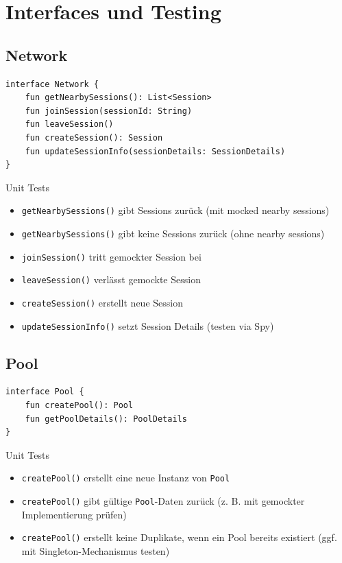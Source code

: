 \documentclass[11pt,a4paper,headsepline,footsepline,bibliography=totocnumbered]{article}
\begin{document}
\section{Interfaces und Testing}
\subsection{Network}
\begin{verbatim}
interface Network {
    fun getNearbySessions(): List<Session>
    fun joinSession(sessionId: String)
    fun leaveSession()
    fun createSession(): Session
    fun updateSessionInfo(sessionDetails: SessionDetails)
}
\end{verbatim}
Unit Tests
 \begin{itemize}
	\item \texttt{getNearbySessions()} gibt Sessions zurück (mit mocked nearby sessions)
	\item \texttt{getNearbySessions()} gibt keine Sessions zurück (ohne nearby sessions)
	\item \texttt{joinSession()} tritt gemockter Session bei
	\item \texttt{leaveSession()} verlässt gemockte Session
	\item \texttt{createSession()} erstellt neue Session
	\item \texttt{updateSessionInfo()} setzt Session Details (testen via Spy)
\end{itemize}

\subsection{Pool} 
\begin{verbatim}
interface Pool {
    fun createPool(): Pool
    fun getPoolDetails(): PoolDetails
}
\end{verbatim}
Unit Tests
\begin{itemize}
	\item \texttt{createPool()} erstellt eine neue Instanz von \texttt{Pool}
	\item \texttt{createPool()} gibt gültige \texttt{Pool}-Daten zurück (z. B. mit gemockter Implementierung prüfen)
	\item \texttt{createPool()} erstellt keine Duplikate, wenn ein Pool bereits existiert (ggf. mit Singleton-Mechanismus testen)
\end{itemize}
\end{document}
